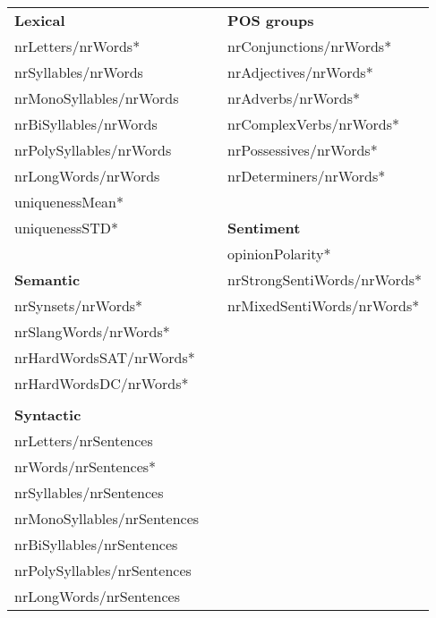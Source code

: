 \begin{tabular}{|l|l|l|} \cline{1-1}\cline{3-3}
\textbf{Lexical} &  & \textbf{POS groups} \\ \cline{1-1}\cline{3-3}
nrLetters/nrWords* &  & nrConjunctions/nrWords* \\ \cline{1-1}\cline{3-3}
nrSyllables/nrWords &  & nrAdjectives/nrWords* \\ \cline{1-1}\cline{3-3}
nrMonoSyllables/nrWords &  & nrAdverbs/nrWords* \\ \cline{1-1}\cline{3-3}
nrBiSyllables/nrWords &  & nrComplexVerbs/nrWords* \\ \cline{1-1}\cline{3-3}
nrPolySyllables/nrWords &  & nrPossessives/nrWords* \\ \cline{1-1}\cline{3-3}
nrLongWords/nrWords &  & nrDeterminers/nrWords* \\ \cline{1-1}\cline{3-3}
uniquenessMean* & \multicolumn{2}{c}{} \\ \cline{1-1}\cline{3-3}
uniquenessSTD* &  & \textbf{Sentiment} \\ \cline{1-1}\cline{3-3}
\multicolumn{2}{c|}{} & opinionPolarity* \\ \cline{1-1}\cline{3-3}
\textbf{Semantic} &  & nrStrongSentiWords/nrWords* \\ \cline{1-1}\cline{3-3}
nrSynsets/nrWords* &  & nrMixedSentiWords/nrWords* \\ \cline{1-1}\cline{3-3}
nrSlangWords/nrWords* & \multicolumn{2}{c}{} \\ \cline{1-1}
nrHardWordsSAT/nrWords* & \multicolumn{2}{c}{} \\ \cline{1-1}
nrHardWordsDC/nrWords* & \multicolumn{2}{c}{} \\ \cline{1-1}
\multicolumn{3}{c}{} \\ \cline{1-1}
\textbf{Syntactic} & \multicolumn{2}{c}{} \\ \cline{1-1}
nrLetters/nrSentences & \multicolumn{2}{c}{} \\ \cline{1-1}
nrWords/nrSentences* & \multicolumn{2}{c}{} \\ \cline{1-1}
nrSyllables/nrSentences & \multicolumn{2}{c}{} \\ \cline{1-1}
nrMonoSyllables/nrSentences & \multicolumn{2}{c}{} \\ \cline{1-1}
nrBiSyllables/nrSentences & \multicolumn{2}{c}{} \\ \cline{1-1}
nrPolySyllables/nrSentences & \multicolumn{2}{c}{} \\ \cline{1-1}
nrLongWords/nrSentences & \multicolumn{2}{c}{} \\ \cline{1-1}
\end{tabular}